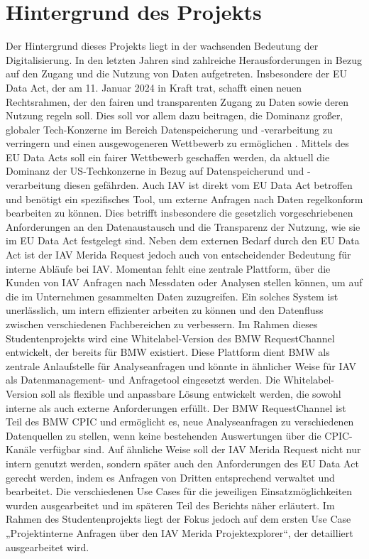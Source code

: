 \section{Hintergrund des Projekts}
Der Hintergrund dieses Projekts liegt in der wachsenden Bedeutung der Digitalisierung. In den letzten Jahren sind zahlreiche Herausforderungen in Bezug auf den Zugang und die Nutzung von Daten aufgetreten. Insbesondere der EU Data Act, der am 11. Januar 2024 in Kraft trat, schafft einen neuen Rechtsrahmen, der den fairen und transparenten Zugang zu Daten sowie deren Nutzung regeln soll. Dies soll vor allem dazu beitragen, die Dominanz großer, globaler Tech-Konzerne im Bereich Datenspeicherung und -verarbeitung zu verringern und einen ausgewogeneren Wettbewerb zu ermöglichen .\cite{EUData_JohnerInstitut,bmdv2024}
\newline
Mittels des EU Data Acts soll ein fairer Wettbewerb geschaffen werden, da aktuell die Dominanz der US-Techkonzerne in Bezug auf Datenspeicherund und -verarbeitung diesen gefährden. \cite{EUData_JohnerInstitut}
\newline
Auch IAV ist direkt vom EU Data Act betroffen und benötigt ein spezifisches Tool, um externe Anfragen nach Daten regelkonform bearbeiten zu können. Dies betrifft insbesondere die gesetzlich vorgeschriebenen Anforderungen an den Datenaustausch und die Transparenz der Nutzung, wie sie im EU Data Act festgelegt sind.
\newline
Neben dem externen Bedarf durch den EU Data Act ist der IAV Merida Request jedoch auch von entscheidender Bedeutung für interne Abläufe bei IAV. Momentan fehlt eine zentrale Plattform, über die Kunden von IAV Anfragen nach Messdaten oder Analysen stellen können, um auf die im Unternehmen gesammelten Daten zuzugreifen. Ein solches System ist unerlässlich, um intern effizienter arbeiten zu können und den Datenfluss zwischen verschiedenen Fachbereichen zu verbessern. 
\newline
\newline
Im Rahmen dieses Studentenprojekts wird eine Whitelabel-Version des BMW RequestChannel entwickelt, der bereits für BMW existiert. Diese Plattform dient BMW als zentrale Anlaufstelle für Analyseanfragen und könnte in ähnlicher Weise für IAV als Datenmanagement- und Anfragetool eingesetzt werden. Die Whitelabel-Version soll als flexible und anpassbare Lösung entwickelt werden, die sowohl interne als auch externe Anforderungen erfüllt.
\newline
Der BMW RequestChannel ist Teil des BMW \ac{CPIC} und ermöglicht es, neue Analyseanfragen zu verschiedenen Datenquellen zu stellen, wenn keine bestehenden Auswertungen über die \ac{CPIC}-Kanäle verfügbar sind. Auf ähnliche Weise soll der IAV Merida Request nicht nur intern genutzt werden, sondern später auch den Anforderungen des EU Data Act gerecht werden, indem es Anfragen von Dritten entsprechend verwaltet und bearbeitet. Die verschiedenen Use Cases für die jeweiligen Einsatzmöglichkeiten wurden ausgearbeitet und im späteren Teil des Berichts näher erläutert. Im Rahmen des Studentenprojekts liegt der Fokus jedoch auf dem ersten Use Case „Projektinterne Anfragen über den IAV Merida Projektexplorer“, der detailliert ausgearbeitet wird.
